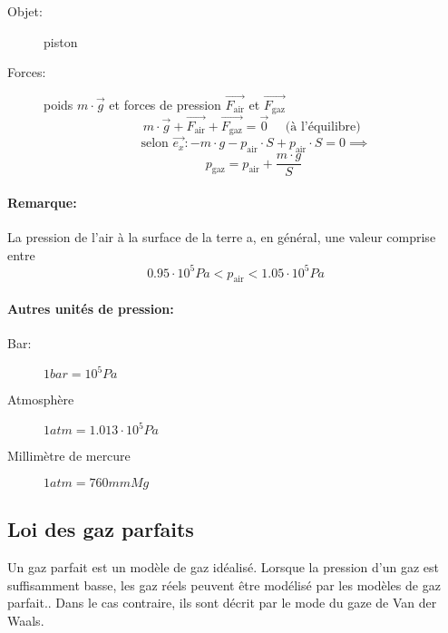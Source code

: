 \documentclass[
    11pt,
    a4paper,
    oneside,
    headinlcude, footinclude,
    twoside,
]{report}
\renewcommand{\vec}[1]{\overrightarrow{#1}}
\begin{document}
\begin{center}
\begin{minipage}{.5\linewidth}
{\begin{tikzpicture}[line cap=round,line join=round,>=triangle 45,x=1.0cm,y=1.0cm]
            \end{tikzpicture}
        }
    \end{minipage}
    \begin{minipage}{.49\linewidth}
        \setlength{\parskip}{.3em}
        \begin{description}
            \item[Objet:] piston
            \item[Forces:] poids $m \cdot \vec g$ et forces de pression $\vec{F_{\text{air}}}$
                et $\vec{F_{\text{gaz}}}$
                $$m \cdot \vec g + \vec{F_{\text{air}}} + \vec{F_{\text{gaz}}}
                = \vec 0 \quad \text{ (à l'équilibre) }$$
                $$\text{ selon } \vec{e_{x}}: -m \cdot g - p_{\text{air}}\cdot S+ p_{\text{air}}\cdot S = 0
                \implies$$
                $$p_{\text{gaz}} = p_{\text{air}} + \frac{m\cdot g}{S}$$
        \end{description}
    \end{minipage}
\end{center}

\paragraph{Remarque:}
La pression de l'air à la surface de la terre a, en général, une valeur
comprise entre 
$$0.95 \cdot 10^{5}Pa < p_{\text{air}} < 1.05 \cdot 10 ^{5}Pa$$

\paragraph{Autres unités de pression:}

\begin{description}
\item[Bar:] $1 bar = 10^{5}Pa$
\item[Atmosphère] $1 atm = 1.013 \cdot 10^{5}Pa$
\item[Millimètre de mercure] $1 atm = 760 mmMg$
\end{description}


\subsection{Loi des gaz parfaits}
\label{sub:loi_des_gaz_parfaits}

Un gaz parfait est un modèle de gaz idéalisé. Lorsque la pression d'un gaz est
suffisamment basse, les gaz réels peuvent être modélisé par les modèles de gaz
parfait.. Dans le cas contraire, ils sont décrit par le mode du gaze de Van
der Waals.
\end{document}
